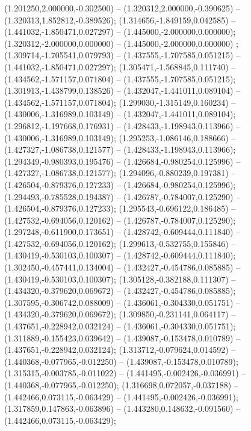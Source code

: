  (1.201250,2.000000,-0.302500) -- (1.320312,2.000000,-0.390625) -- (1.320313,1.852812,-0.389526);
 (1.314656,-1.849159,0.042585) -- (1.441032,-1.850471,0.027297) -- (1.445000,-2.000000,0.000000);
 (1.320312,-2.000000,0.000000) -- (1.445000,-2.000000,0.000000) ;
 (1.309714,-1.705541,0.079793) -- (1.437555,-1.707585,0.051215) -- (1.441032,-1.850471,0.027297);
 (1.305471,-1.568845,0.111740) -- (1.434562,-1.571157,0.071804) -- (1.437555,-1.707585,0.051215);
 (1.301913,-1.438799,0.138526) -- (1.432047,-1.441011,0.089104) -- (1.434562,-1.571157,0.071804);
 (1.299030,-1.315149,0.160234) -- (1.430006,-1.316989,0.103149) -- (1.432047,-1.441011,0.089104);
 (1.296812,-1.197668,0.176931) -- (1.428433,-1.198943,0.113966) -- (1.430006,-1.316989,0.103149);
 (1.295253,-1.086146,0.188666) -- (1.427327,-1.086738,0.121577) -- (1.428433,-1.198943,0.113966);
 (1.294349,-0.980393,0.195476) -- (1.426684,-0.980254,0.125996) -- (1.427327,-1.086738,0.121577);
 (1.294096,-0.880239,0.197381) -- (1.426504,-0.879376,0.127233) -- (1.426684,-0.980254,0.125996);
 (1.294493,-0.785528,0.194387) -- (1.426787,-0.784007,0.125290) -- (1.426504,-0.879376,0.127233);
 (1.295543,-0.696122,0.186485) -- (1.427532,-0.694056,0.120162) -- (1.426787,-0.784007,0.125290);
 (1.297248,-0.611900,0.173651) -- (1.428742,-0.609444,0.111840) -- (1.427532,-0.694056,0.120162);
 (1.299613,-0.532755,0.155846) -- (1.430419,-0.530103,0.100307) -- (1.428742,-0.609444,0.111840);
 (1.302450,-0.457441,0.134004) -- (1.432427,-0.454786,0.085885) -- (1.430419,-0.530103,0.100307);
 (1.305128,-0.382188,0.111307) -- (1.434320,-0.379620,0.069672) -- (1.432427,-0.454786,0.085885);
 (1.307595,-0.306742,0.088009) -- (1.436061,-0.304330,0.051751) -- (1.434320,-0.379620,0.069672);
 (1.309850,-0.231141,0.064117) -- (1.437651,-0.228942,0.032124) -- (1.436061,-0.304330,0.051751);
 (1.311889,-0.155423,0.039642) -- (1.439087,-0.153478,0.010789) -- (1.437651,-0.228942,0.032124);
 (1.313712,-0.079624,0.014592) -- (1.440368,-0.077965,-0.012250) -- (1.439087,-0.153478,0.010789);
 (1.315315,-0.003785,-0.011022) -- (1.441495,-0.002426,-0.036991) -- (1.440368,-0.077965,-0.012250);
 (1.316698,0.072057,-0.037188) -- (1.442466,0.073115,-0.063429) -- (1.441495,-0.002426,-0.036991);
 (1.317859,0.147863,-0.063896) -- (1.443280,0.148632,-0.091560) -- (1.442466,0.073115,-0.063429);
